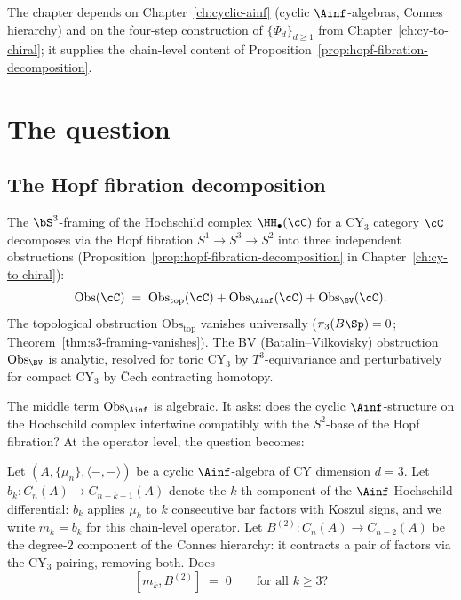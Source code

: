 The chapter depends on Chapter~\ref{ch:cyclic-ainf} (cyclic
$\Ainf$-algebras, Connes hierarchy) and on the four-step
construction of $\{\Phi_d\}_{d \geq 1}$ from Chapter~\ref{ch:cy-to-chiral}; it
supplies the chain-level content of
Proposition~\ref{prop:hopf-fibration-decomposition}.


\section{The question}
\label{sec:m3b2-question}

\subsection{The Hopf fibration decomposition}
\label{subsec:m3b2-hopf}

The $\bS^3$-framing of the Hochschild complex $\HH_\bullet(\cC)$
for a CY$_3$ category $\cC$ decomposes via the Hopf fibration
$S^1 \to S^3 \to S^2$ into three independent obstructions
(Proposition~\ref{prop:hopf-fibration-decomposition} in
Chapter~\ref{ch:cy-to-chiral}):
\begin{equation}
\label{eq:obs-decomposition}
 \mathrm{Obs}(\cC) \;=\; \mathrm{Obs}_{\mathrm{top}}(\cC)
 + \mathrm{Obs}_{\Ainf}(\cC) + \mathrm{Obs}_{\BV}(\cC).
\end{equation}
The topological obstruction $\mathrm{Obs}_{\mathrm{top}}$
vanishes universally ($\pi_3(B\Sp) = 0$; Theorem~\ref{thm:s3-framing-vanishes}).
The BV (Batalin--Vilkovisky) obstruction $\mathrm{Obs}_{\BV}$ is
analytic, resolved for toric CY$_3$ by $T^3$-equivariance and
perturbatively for compact CY$_3$ by \v{C}ech contracting
homotopy.

The middle term $\mathrm{Obs}_{\Ainf}$ is algebraic.
It asks: does the cyclic $\Ainf$-structure on the Hochschild
complex intertwine compatibly with the $S^2$-base of the Hopf
fibration?  At the operator level, the question becomes:


\begin{openproblem}
\label{op:mk-b2}
Let $(A, \{\mu_n\}, \langle -,- \rangle)$ be a cyclic
$\Ainf$-algebra of CY dimension $d = 3$.  Let
$b_k \colon C_n(A) \to C_{n-k+1}(A)$ denote the $k$-th
component of the $\Ainf$-Hochschild differential: $b_k$
applies $\mu_k$ to $k$ consecutive bar factors with Koszul
signs, and we write $m_k = b_k$ for this chain-level
operator.  Let $B^{(2)} \colon C_n(A) \to C_{n-2}(A)$ be the
degree-$2$ component of the Connes hierarchy: it contracts a
pair of factors via the CY$_3$ pairing, removing both.  Does
\begin{equation}
\label{eq:mk-b2-question}
 [m_k, B^{(2)}] \;=\; 0 \qquad \text{for all } k \geq 3\text{?}
\end{equation}
\end{openproblem}

